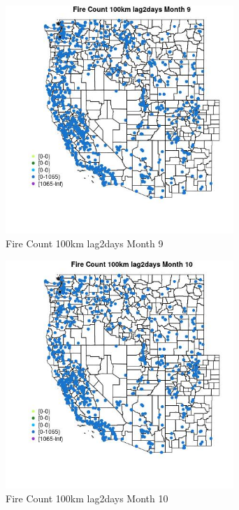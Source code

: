 \begin{figure} 
\centering  
\includegraphics[width=0.77\textwidth]{Code_Outputs/Report_ML_input_PM25_Step4_part_f_de_duplicated_aves_prioritize_24hr_obswNAs_MapObsMo9Fire_Count_100km_lag2days.jpg} 
\caption{\label{fig:Report_ML_input_PM25_Step4_part_f_de_duplicated_aves_prioritize_24hr_obswNAsMapObsMo9Fire_Count_100km_lag2days}Fire Count 100km lag2days Month 9} 
\end{figure} 
 

\begin{figure} 
\centering  
\includegraphics[width=0.77\textwidth]{Code_Outputs/Report_ML_input_PM25_Step4_part_f_de_duplicated_aves_prioritize_24hr_obswNAs_MapObsMo10Fire_Count_100km_lag2days.jpg} 
\caption{\label{fig:Report_ML_input_PM25_Step4_part_f_de_duplicated_aves_prioritize_24hr_obswNAsMapObsMo10Fire_Count_100km_lag2days}Fire Count 100km lag2days Month 10} 
\end{figure} 
 


